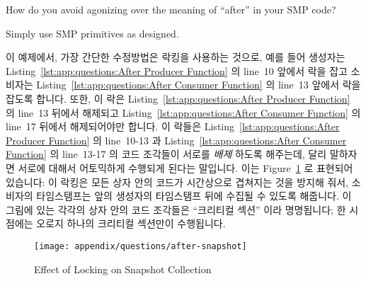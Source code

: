 How do you avoid agonizing over the meaning of ``after'' in your
SMP code?

Simply use SMP primitives as designed.
\fi

이 예제에서, 가장 간단한 수정방법은 락킹을 사용하는 것으로, 예를 들어 생성자는
Listing~\ref{lst:app:questions:After Producer Function} 의 line~10 앞에서 락을
잡고 소비자는
Listing~\ref{lst:app:questions:After Consumer Function} 의 line~13 앞에서 락을
잡도록 합니다.
또한, 이 락은
Listing~\ref{lst:app:questions:After Producer Function} 의 line~13 뒤에서
해제되고
Listing~\ref{lst:app:questions:After Consumer Function} 의 line~17 뒤에서
해제되어야만 합니다.
이 락들은
Listing~\ref{lst:app:questions:After Producer Function} 의 line~10-13 과
Listing~\ref{lst:app:questions:After Consumer Function} 의 line~13-17 의 코드
조각들이 서로를 {\em 배제} 하도록 해주는데, 달리 말하자면 서로에 대해서
어토믹하게 수행되게 된다는 말입니다.
이는
Figure~\ref{fig:app:questions:Effect of Locking on Snapshot Collection} 로
표현되어 있습니다:
이 락킹은 모든 상자 안의 코드가 시간상으로 겹쳐지는 것을 방지해 줘서, 소비자의
타임스탬프는 앞의 생성자의 타임스탬프 뒤에 수집될 수 있도록 해줍니다.
이 그림에 있는 각각의 상자 안의 코드 조각들은 ``크리티컬 섹션'' 이라
명명됩니다; 한 시점에는 오로지 하나의 크리티컬 섹션만이 수행됩니다.
\iffalse

In this example, the easiest fix is to use locking, for example,
acquire a lock in the producer before line~10 in
Listing~\ref{lst:app:questions:After Producer Function} and in
the consumer before line~13 in
Listing~\ref{lst:app:questions:After Consumer Function}.
This lock must also be released after line~13 in
Listing~\ref{lst:app:questions:After Producer Function} and
after line~17 in
Listing~\ref{lst:app:questions:After Consumer Function}.
These locks cause the code segments in lines~10-13 of
Listing~\ref{lst:app:questions:After Producer Function} and in lines~13-17 of
Listing~\ref{lst:app:questions:After Consumer Function} to {\em exclude}
each other, in other words, to run atomically with respect to each other.
This is represented in
Figure~\ref{fig:app:questions:Effect of Locking on Snapshot Collection}:
the locking prevents any of the boxes of code from overlapping in time, so
that the consumer's timestamp must be collected after the prior
producer's timestamp.
The segments of code in each box in this figure are termed
``critical sections''; only one such critical section may be executing
at a given time.
\fi

\begin{figure}[htb]
\centering
\texttt{[image: appendix/questions/after-snapshot]}
\caption{Effect of Locking on Snapshot Collection}
\label{fig:app:questions:Effect of Locking on Snapshot Collection}
\end{figure}

